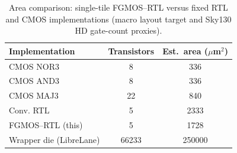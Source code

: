 \begin{table}[ht]
\centering
\caption{Area comparison: single-tile FGMOS--RTL versus fixed RTL and CMOS implementations (macro layout target and Sky130 HD gate-count proxies).}
\label{tbl:area_compare}
\begin{tabular}{@{}lcc@{}}
\toprule
Implementation & Transistors & Est.\ area ($\mu$m$^2$) \\
\midrule
CMOS NOR3 & 8 & 336 \\
CMOS AND3 & 8 & 336 \\
CMOS MAJ3 & 22 & 840 \\
Conv. RTL & 5 & 2333 \\
FGMOS–RTL (this) & 5 & 1728 \\
\midrule
Wrapper die (LibreLane) & 66233 & 250000 \\
\bottomrule
\end{tabular}
\end{table}
